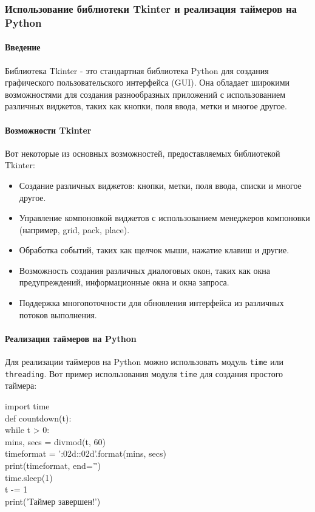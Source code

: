 \subsubsection{Использование библиотеки Tkinter и реализация таймеров на Python}
	
\paragraph{Введение}
Библиотека Tkinter - это стандартная библиотека Python для создания графического пользовательского интерфейса (GUI). Она обладает широкими возможностями для создания разнообразных приложений с использованием различных виджетов, таких как кнопки, поля ввода, метки и многое другое.
	
\paragraph{Возможности Tkinter}
Вот некоторые из основных возможностей, предоставляемых библиотекой Tkinter:
	
\begin{itemize}
	\item Создание различных виджетов: кнопки, метки, поля ввода, списки и многое другое.
	\item Управление компоновкой виджетов с использованием менеджеров компоновки (например, grid, pack, place).
	\item Обработка событий, таких как щелчок мыши, нажатие клавиш и другие.
	\item Возможность создания различных диалоговых окон, таких как окна предупреждений, информационные окна и окна запроса.
	\item Поддержка многопоточности для обновления интерфейса из различных потоков выполнения.
\end{itemize}
	
\paragraph{Реализация таймеров на Python}
Для реализации таймеров на Python можно использовать модуль \texttt{time} или \texttt{threading}. Вот пример использования модуля \texttt{time} для создания простого таймера:
	
	import time\\
	
	def countdown(t):\\
	while t > 0:\\
	mins, secs = divmod(t, 60)\\
	timeformat = '{:02d}:{:02d}'.format(mins, secs)\\
	print(timeformat, end='\r')\\
	time.sleep(1)\\
	t -= 1\\
	print('Таймер завершен!')\\
	

